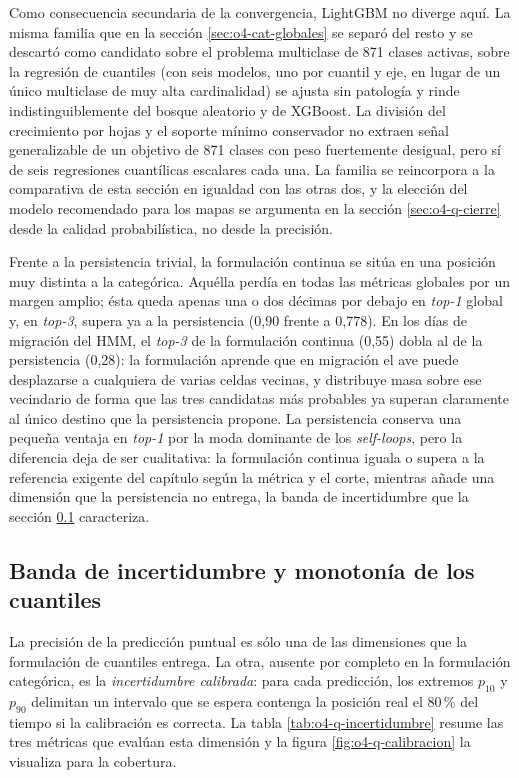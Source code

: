 Como consecuencia secundaria de la convergencia, LightGBM no diverge aquí. La misma
familia que en la sección \ref{sec:o4-cat-globales} se separó del resto y se
descartó como candidato sobre el problema multiclase de 871 clases activas, sobre
la regresión de cuantiles (con seis modelos, uno por cuantil y eje, en lugar de un
único multiclase de muy alta cardinalidad) se ajusta sin patología y rinde
indistinguiblemente del bosque aleatorio y de XGBoost. La división del crecimiento
por hojas y el soporte mínimo conservador no extraen señal generalizable de un
objetivo de 871 clases con peso fuertemente desigual, pero sí de seis regresiones
cuantílicas escalares cada una. La familia se reincorpora a la comparativa de esta
sección en igualdad con las otras dos, y la elección del modelo recomendado para
los mapas se argumenta en la sección \ref{sec:o4-q-cierre} desde la calidad
probabilística, no desde la precisión.

Frente a la persistencia trivial, la formulación continua se sitúa en una posición
muy distinta a la categórica. Aquélla perdía en todas las métricas globales por un
margen amplio; ésta queda apenas una o dos décimas por debajo en \textit{top-1}
global y, en \textit{top-3}, supera ya a la persistencia (0,90 frente a 0,778).
En los días de migración del HMM, el \textit{top-3} de la formulación continua
(0,55) dobla al de la persistencia (0,28): la formulación aprende que en migración
el ave puede desplazarse a cualquiera de varias celdas vecinas, y distribuye masa
sobre ese vecindario de forma que las tres candidatas más probables ya superan
claramente al único destino que la persistencia propone. La persistencia conserva
una pequeña ventaja en \textit{top-1} por la moda dominante de los \textit{self-loops},
pero la diferencia deja de ser cualitativa: la formulación continua iguala o supera
a la referencia exigente del capítulo según la métrica y el corte, mientras añade
una dimensión que la persistencia no entrega, la banda de incertidumbre que la
sección \ref{sec:o4-q-incertidumbre} caracteriza.

\subsection{Banda de incertidumbre y monotonía de los cuantiles}
\label{sec:o4-q-incertidumbre}

La precisión de la predicción puntual es sólo una de las dimensiones que la
formulación de cuantiles entrega. La otra, ausente por completo en la formulación
categórica, es la \emph{incertidumbre calibrada}: para cada predicción, los
extremos $p_{10}$ y $p_{90}$ delimitan un intervalo que se espera contenga la
posición real el 80\,\% del tiempo si la calibración es correcta. La tabla
\ref{tab:o4-q-incertidumbre} resume las tres métricas que evalúan esta dimensión y
la figura \ref{fig:o4-q-calibracion} la visualiza para la cobertura.


